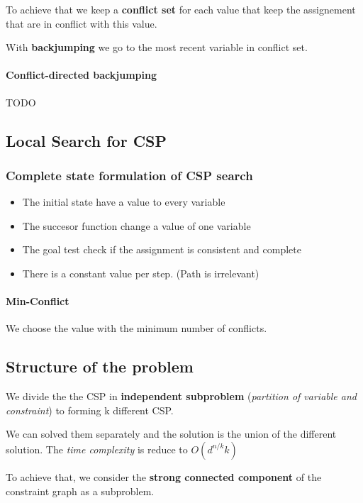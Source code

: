 To achieve that we keep a \textbf{conflict set} for each value that keep
the assignement that are in conflict with this value.

With \textbf{backjumping} we go to  the most recent variable in conflict
set.

\paragraph{Conflict-directed backjumping} TODO


\subsection{Local Search for CSP}

\subsubsection{Complete state formulation of CSP search }
\begin{itemize}
	\item The initial state have a value to every variable
	\item The succesor function change a value of one variable
	\item The goal test check if the assignment is consistent and complete
	\item There is a constant value per step. (Path is irrelevant)
\end{itemize}

\paragraph{Min-Conflict} We choose the value with the minimum number of conflicts.

\subsection{Structure of the problem}

We   divide    the   the   CSP   in    \textbf{independent   subproblem}
(\textit{partition of  variable and constraint}) to  forming k different
CSP.

We can solved them separately and the solution is the union of the different
solution. The \textit{time complexity} is reduce to $O(d^{n/k} k)$

To achieve that, we consider  the \textbf{strong connected component} of
the constraint graph as a subproblem.

